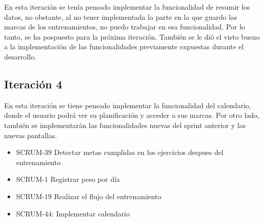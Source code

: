 En esta iteración se tenía pensado implementar la funcionalidad de resumir los datos, no obstante, al no tener implementada la parte en la que guardo las marcas de los entrenamientos, no puedo trabajar en esa funcionalidad. Por lo tanto, se ha pospuesto para la próxima iteración. También se le dió el visto bueno a la implementación de las funcionalidades previamente expuestas durante el desarrollo.

\subsection{Iteración 4}

En esta iteración se tiene pensado implementar la funcionalidad del calendario, donde el usuario podrá ver su planificación y acceder a sus marcas. Por otro lado, también se implementarán las funcionalidades nuevas del sprint anterior y las nuevas pantallas.

\begin{itemize}
	  \item SCRUM-39 Detectar metas cumplidas en los ejercicios despues del entrenamiento
	  \item SCRUM-1 Registrar peso por día
	  \item SCRUM-19 Realizar el flujo del entrenamiento
	  \item SCRUM-44: Implementar calendario
\end{itemize}

